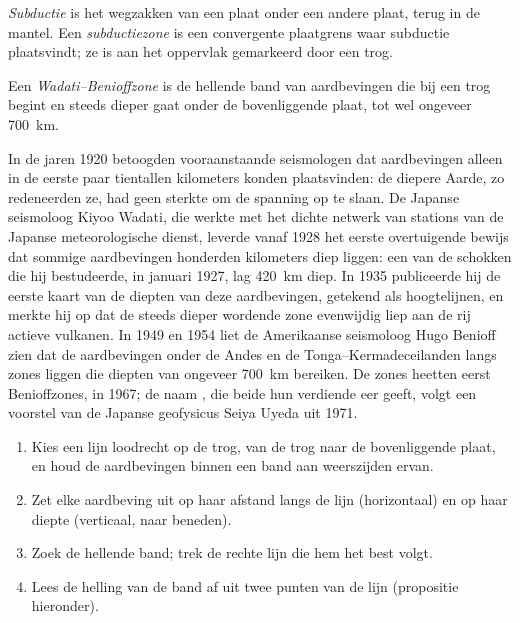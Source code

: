 \begin{definition}\label{def:g11:subduction-zones:subduction}
\emph{Subductie} is het wegzakken van een plaat  onder een andere plaat, terug in de mantel. Een
\emph{subductiezone} is een convergente plaatgrens waar subductie
plaatsvindt; ze is aan het oppervlak gemarkeerd door een trog.
\end{definition}

\begin{definition}\label{def:g11:subduction-zones:benioff}
Een \emph{Wadati--Benioffzone} is de hellende
band van aardbevingen die bij een trog begint en steeds dieper gaat onder
de bovenliggende plaat, tot wel ongeveer \qty{700}{km}.
\end{definition}

\begin{history}
In de jaren 1920 betoogden vooraanstaande seismologen dat aardbevingen alleen
in de eerste paar tientallen kilometers konden plaatsvinden: de diepere Aarde, zo
redeneerden ze, had geen sterkte om de spanning op te slaan. De Japanse seismoloog Kiyoo Wadati, die werkte met het
dichte netwerk van stations van de Japanse meteorologische dienst, leverde vanaf 1928
het eerste overtuigende bewijs dat sommige aardbevingen honderden
kilometers diep liggen: een van de schokken die hij bestudeerde, in januari 1927, lag
\qty{420}{km} diep. In 1935 publiceerde hij de eerste kaart van de diepten van
deze aardbevingen, getekend als hoogtelijnen, en merkte hij op dat de steeds dieper
wordende zone evenwijdig liep aan de rij actieve vulkanen. In 1949 en 1954 liet de
Amerikaanse seismoloog Hugo Benioff zien dat de aardbevingen onder de Andes en de
Tonga--Kermadeceilanden langs zones liggen die diepten van
ongeveer \qty{700}{km} bereiken. De zones heetten eerst Benioffzones, in 1967; de
naam , die beide hun verdiende eer geeft, volgt een voorstel
van de Japanse geofysicus Seiya Uyeda uit 1971.
\end{history}

\begin{method}\label{met:g11:subduction-zones:section}
\begin{enumerate}
  \item Kies een lijn loodrecht op de trog, van de trog naar de
        bovenliggende plaat, en houd de aardbevingen binnen een band aan weerszijden
        ervan.
  \item Zet elke aardbeving uit op haar afstand langs de lijn (horizontaal)
        en op haar diepte (verticaal, naar beneden).
  \item Zoek de hellende band; trek de rechte lijn die hem het best
        volgt.
  \item Lees de helling van de band af uit twee punten van de lijn (propositie
        hieronder).
\end{enumerate}
\end{method}

